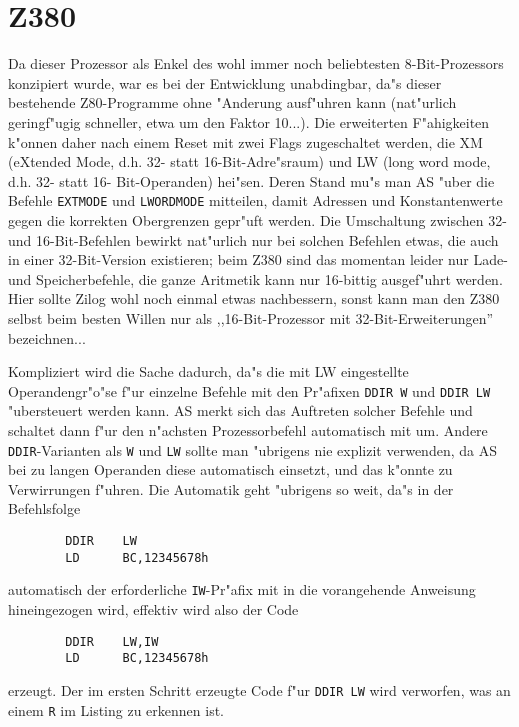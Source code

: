 \documentclass[12pt,a4paper,twoside]{report}
\newcommand{\tty}[1]{{\tt #1}}
\begin{document}

\section{Z380}

Da dieser Prozessor als Enkel des wohl immer noch beliebtesten
8-Bit-Prozessors konzipiert wurde, war es bei der Entwicklung
unabdingbar, da"s dieser bestehende Z80-Programme ohne "Anderung
ausf"uhren kann (nat"urlich geringf"ugig schneller, etwa um den
Faktor 10...).  Die erweiterten F"ahigkeiten k"onnen daher nach
einem Reset mit zwei Flags zugeschaltet werden, die XM (eXtended
Mode, d.h. 32- statt 16-Bit-Adre"sraum) und LW (long word mode,
d.h. 32- statt 16- Bit-Operanden) hei"sen.  Deren Stand mu"s man
AS "uber die Befehle \tty{EXTMODE} und \tty{LWORDMODE} mitteilen, damit
Adressen und Konstantenwerte gegen die korrekten Obergrenzen
gepr"uft werden.  Die Umschaltung zwischen 32- und 16-Bit-Befehlen
bewirkt nat"urlich nur bei solchen Befehlen etwas, die auch in
einer 32-Bit-Version existieren; beim Z380 sind das momentan
leider nur Lade- und Speicherbefehle, die ganze Aritmetik kann
nur 16-bittig ausgef"uhrt werden.  Hier sollte Zilog wohl noch
einmal etwas nachbessern, sonst kann man den Z380 selbst beim
besten Willen nur als ,,16-Bit-Prozessor mit 32-Bit-Erweiterungen''
bezeichnen...

Kompliziert wird die Sache dadurch, da"s die mit LW eingestellte
Operandengr"o"se f"ur einzelne Befehle mit den Pr"afixen \tty{DDIR W}
und \tty{DDIR LW} "ubersteuert werden kann.  AS merkt sich das
Auftreten solcher Befehle und schaltet dann f"ur den n"achsten
Prozessorbefehl automatisch mit um.  Andere \tty{DDIR}-Varianten
als \tty{W} und \tty{LW} sollte man "ubrigens nie explizit
verwenden, da AS bei zu langen Operanden diese automatisch
einsetzt, und das k"onnte zu Verwirrungen f"uhren.  Die Automatik
geht "ubrigens so weit, da"s in der Befehlsfolge
\begin{verbatim}
        DDIR    LW
        LD      BC,12345678h
\end{verbatim}
automatisch der erforderliche \tty{IW}-Pr"afix mit in die
vorangehende Anweisung hineingezogen wird, effektiv wird also
der Code
\begin{verbatim}
        DDIR    LW,IW
        LD      BC,12345678h
\end{verbatim}
erzeugt.  Der im ersten Schritt erzeugte Code f"ur \tty{DDIR LW}
wird verworfen, was an einem \tty{R} im Listing zu erkennen
ist.
\end{document}
